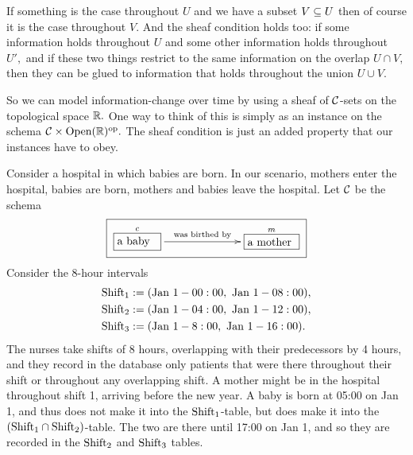 \documentclass[CT4S-EN-RU]{subfiles}
\begin{document}
\begin{blockRUS}
\end{blockRUS}

\begin{blockENG}
If something is the case throughout $U$ and we have a subset $V\ss U$ then of course it is the case throughout $V.$ And the sheaf condition holds too: if some information holds throughout $U$ and some other information holds throughout $U',$ and if these two things restrict to the same information on the overlap $U\cap V,$ then they can be glued to information that holds throughout the union $U\cup V.$
\end{blockENG}

\begin{blockRUS}
\end{blockRUS}

\begin{blockENG}
So we can model information-change over time by using a sheaf of $\mcC$-sets on the topological space $\RR.$ One way to think of this is simply as an instance on the schema $\mcC\times\Op(\RR)\op.$ The sheaf condition is just an added property that our instances have to obey.
\end{blockENG}

\begin{blockRUS}
\end{blockRUS}

\begin{exampleENG}
Consider a hospital in which babies are born. In our scenario, mothers enter the hospital, babies are born, mothers and babies leave the hospital. Let $\mcC$ be the schema 
$$\fbox{\xymatrix{\obox{c}{.5in}{a baby}\LA{rr}{was birthed by}&\hspace{.2in}&\obox{m}{.6in}{a mother}}}$$
Consider the 8-hour intervals 
\begin{align*}
\tn{Shift}_1&:=(\tn{Jan }1 - 00:00,\tn{ Jan }1 - 08:00),\\
\tn{Shift}_2&:=(\tn{Jan }1 - 04:00,\tn{ Jan }1 - 12:00),\\
\tn{Shift}_3&:=(\tn{Jan }1 - 8:00,\tn{ Jan }1 - 16:00).
\end{align*}
The nurses take shifts of 8 hours, overlapping with their predecessors by 4 hours, and they record in the database only patients that were there throughout their shift or throughout any overlapping shift. A mother might be in the hospital throughout shift 1, arriving before the new year. A baby is born at 05:00 on Jan 1, and thus does not make it into the $\tn{Shift}_1$-table, but does make it into the $(\tn{Shift}_1\cap\tn{Shift}_2)$-table. The two are there until 17:00 on Jan 1, and so they are recorded in the $\tn{Shift}_2$ and $\tn{Shift}_3$ tables. 
\end{exampleENG}
\end{document}
